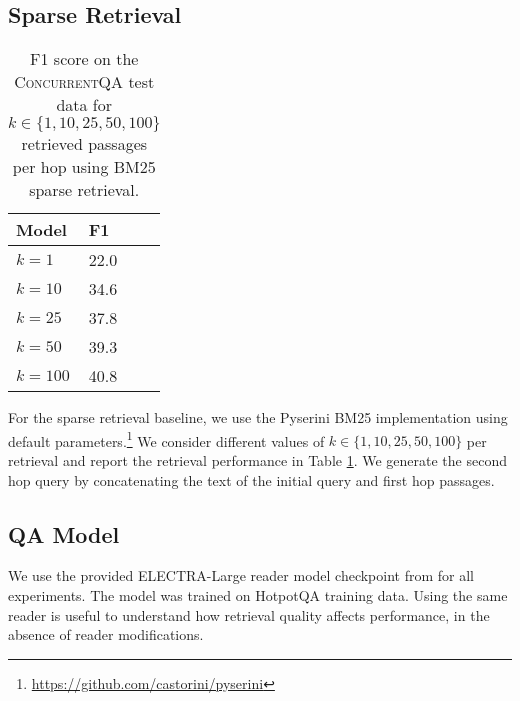 \documentclass{article}
\newcommand{\datasetname}{\textsc{ConcurrentQA}\xspace}
\begin{document}
\subsection{Sparse Retrieval}
\begin{table}[t!]
    \begin{center}
    \normalsize
    \begin{tabular}{llcc}
    \toprule
    Model  &    F1   \\
    \midrule
    $k=1$      &  22.0  \\
    $k=10$      & 34.6  \\
    $k=25$      & 37.8  \\
    $k=50$      & 39.3  \\
    $k=100$     & 40.8  \\
    \bottomrule
    \end{tabular}
    \normalsize
    \caption{F1 score on the \datasetname test data  for $k \in \{1, 10, 25, 50, 100\}$ retrieved passages per hop using BM25 sparse retrieval.}
    \vspace{2mm}
    \label{tab:bm25_varyk}
    \end{center}
\end{table}
For the sparse retrieval baseline, we use the Pyserini BM25 implementation using default parameters.\footnote{\url{https://github.com/castorini/pyserini}} We consider different values of $k \in \{1, 10, 25, 50, 100\}$ per retrieval and report the retrieval performance in Table \ref{tab:bm25_varyk}. We generate the second hop query by concatenating the text of the initial query and first hop passages.

\subsection{QA Model}
We use the provided ELECTRA-Large reader model checkpoint from \citet{xiong2021mdr} for all experiments. The model was trained on HotpotQA training data. Using the same reader is useful to understand how retrieval quality affects performance, in the absence of reader modifications. 
\end{document}
